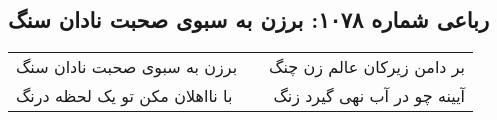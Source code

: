 \begin{center}
\section*{رباعی شماره ۱۰۷۸: برزن به سبوی صحبت نادان سنگ}
\label{sec:1078}
\begin{longtable}{l p{0.5cm} r}
برزن به سبوی صحبت نادان سنگ
&&
بر دامن زیرکان عالم زن چنگ
\\
با نااهلان مکن تو یک لحظه درنگ
&&
آیینه چو در آب نهی گیرد زنگ
\\
\end{longtable}
\end{center}
